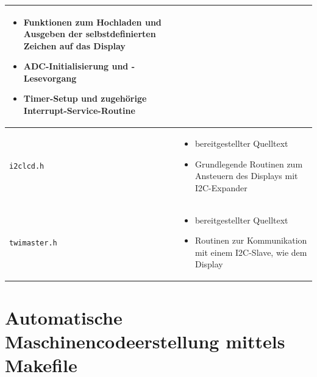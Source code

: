\begin{center}
\begin{longtable}{|p{}|p{}|}
\begin{itemize}
					\setlength\itemsep{-0.5em}
					\item Funktionen zum Hochladen und Ausgeben der selbstdefinierten Zeichen auf das Display
					\item ADC-Initialisierung und -Lesevorgang
					\item Timer-Setup und zugehörige Interrupt-Service-Routine
					\end{itemize} 
\\ 
\hline
\texttt{i2clcd.h} &	\begin{itemize}
					\setlength\itemsep{-0.5em}
					\item bereitgestellter Quelltext
					\item Grundlegende Routinen zum Ansteuern des Displays mit I2C-Expander
					\end{itemize} 
\\ 
\hline 
\texttt{twimaster.h} &	\begin{itemize}
					\setlength\itemsep{-0.5em}
					\item bereitgestellter Quelltext
					\item Routinen zur Kommunikation mit einem I2C-Slave, wie dem Display
					\end{itemize} 
\\ 
\hline 
\end{longtable}
\end{center}

\section{Automatische Maschinencodeerstellung mittels Makefile}
\label{sec:Make}


 

